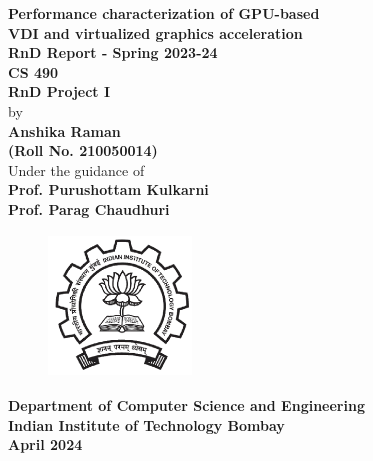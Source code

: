 \documentclass[a4paper,12pt, final]{report}
\begin{document}
    \thispagestyle{empty}
    \vspace*{1cm}
{
    \centering
    \textbf{\LARGE Performance characterization of GPU-based\vspace{10pt}\\
    VDI and virtualized graphics acceleration}\\
    \vspace{1.20cm}
    \textbf{\large RnD Report - Spring 2023-24}\\
    \vspace{1cm}
    \large{\textbf{CS 490}}\\
    \large{\textbf{RnD Project I}}\\
    \vspace{1.50cm}
    {by}\\
    \vspace{0.20cm}
    \textbf{\large Anshika Raman}\\
    \vspace{0.25cm}
    \textbf{\large (Roll No. 210050014)}\\
    \vspace{1.8cm}
    {Under the guidance of}\\
    \vspace{0.20cm}
    \textbf{\large Prof. Purushottam Kulkarni}\\
    \textbf{\large Prof. Parag Chaudhuri}\\
    \vspace{0.30cm}
    \vspace{1.450cm}
    
    \begin{figure}[htb]
        \begin{center}\includegraphics[height=1.5in,width=1.5in]{images/iitblogo.png}
        \end{center}
    \end{figure}

    {\textbf{Department of Computer Science and Engineering}}\\
    {\textbf{Indian Institute of Technology Bombay}}\\[10pt]
    {\textbf{April 2024}}
    
}
\end{document}
